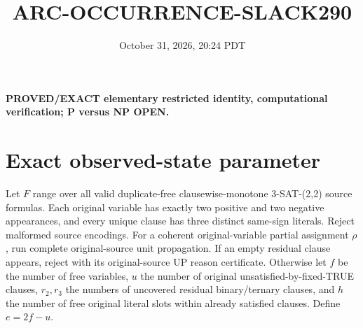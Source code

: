 \documentclass{article}
\title{ARC-OCCURRENCE-SLACK290}
\date{October 31, 2026, 20:24 PDT}
\begin{document}
\maketitle
\noindent\textbf{PROVED/EXACT elementary restricted identity, computational verification; P versus NP OPEN.}

\section{Exact observed-state parameter}
Let $F$ range over all valid duplicate-free clausewise-monotone 3-SAT-(2,2) source formulas. Each original variable has exactly two positive and two negative appearances, and every unique clause has three distinct same-sign literals. Reject malformed source encodings. For a coherent original-variable partial assignment $\rho$, run complete original-source unit propagation. If an empty residual clause appears, reject with its original-source UP reason certificate. Otherwise let $f$ be the number of free variables, $u$ the number of original unsatisfied-by-fixed-TRUE clauses, $r_2,r_3$ the numbers of uncovered residual binary/ternary clauses, and $h$ the number of free original literal slots within already satisfied clauses. Define $e=2f-u$.
\end{document}
